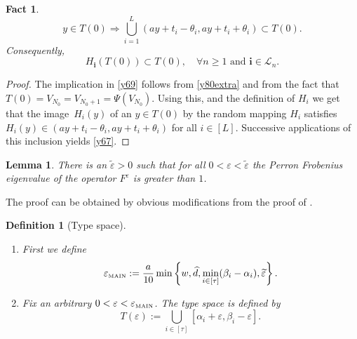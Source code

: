 \documentclass[amssymb,amsfonts,12pt,verbatim,righttag,oneside]{amsart}
\numberwithin{equation}{section} %
\theoremstyle{plain}
\newcommand{\fmu}{\ensuremath{\,}}
\theoremstyle{plain}
\newtheorem{definition}[theorem]{Definition}
\newtheorem{fact}[theorem]{Fact}
\newtheorem{lemma}[theorem]{Lemma}
\begin{document}
\begin{fact}\label{y70}
  \begin{equation}
  \label{y69}
  y\in T(0) \Longrightarrow
  \bigcup\limits_{i=1}^{L}
  (ay+t_i-\theta _i,ay+t_i+\theta _i)\subset T(0).
  \end{equation}
  Consequently,
\begin{equation}
\label{y67}
H_{\mathbf{i}}(T(0))\subset T(0),\quad
\forall n\geq 1 \text{ and }
\mathbf{i}\in\mathcal{L}_{n}.
\end{equation}
\end{fact}
\begin{proof}
  The implication in \eqref{y69} follows from  \eqref{y80extra} and from the fact
 that $T(0)=V_{N_0}=V_{N_0+1}=\Psi (V_{N_0})$.
 Using this, and the definition of $H_i$ we get that  the image \fmu $H_{i}(y)$ of an $y\in T(0)$ by the random mapping
 $H_{i}$ satisfies $H_{i}(y) \in (ay+t_i-\theta _i,ay+t_i+\theta _i)$ for all $i\in [L]$.
 Successive applications of this inclusion  yields \eqref{y67}.
\end{proof}

\begin{lemma}\label{z39}
  There is an $\widetilde{\varepsilon} >0$ such that
for all $0<\varepsilon <\widetilde{\varepsilon }$  the Perron Frobenius eigenvalue of the operator $F^{\varepsilon }$ is greater than $1$.
\end{lemma}

The proof can be obtained by obvious modifications from the proof of \cite[Lemma 8A]{dekking2011algebraic}.



\begin{definition}[Type space]\label{z42}\
\begin{enumerate}
[{\bf (a)}]
  \item First we define
  \begin{equation}
  \label{z41}
  \varepsilon _{{\rm\scriptscriptstyle{MAIN}}}:=
  \frac{a}{10}\min\left\{
w,\widehat{d},\min\limits_{i\in[\tau]}(\beta _i-\alpha _i),
\widetilde{\varepsilon  }
   \right\}.
  \end{equation}
  \item
Fix an arbitrary  $0< \varepsilon < \varepsilon _{{\rm\scriptscriptstyle{MAIN}}}$. The type space is defined by
\begin{equation}
  \label{z40}
  T(\varepsilon ):=
  \bigcup\limits_{i\in[\tau]}\left[
  \alpha _i+\varepsilon ,\beta _i-\varepsilon
   \right].
  \end{equation}
\end{enumerate}
\end{definition}
\end{document}

